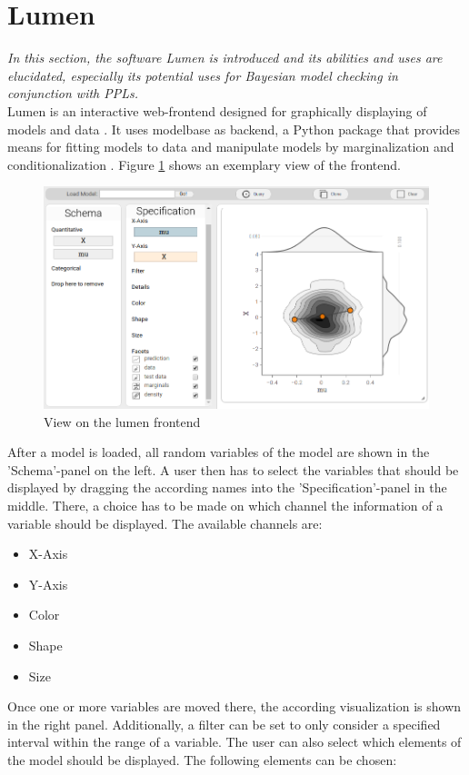 \documentclass{article}
\begin{document}
\section{Lumen}
\label{sec:Lumen}
\textit{In this section, the software Lumen is introduced and its abilities and uses are elucidated, especially its potential uses for Bayesian model checking in conjunction with PPLs.}
\\ 
Lumen is an interactive web-frontend designed for graphically displaying of models and data \cite{Lucas2016a}. It uses modelbase as backend, a Python package that provides means for fitting models to data and manipulate models by marginalization and conditionalization \cite{Lucas2016b}. Figure \ref{fig:lumen_screenshot} shows an exemplary view of the frontend.
\begin{figure}
	\includegraphics[width=\textwidth]{images/lumen_screenshot.png}
	\caption{View on the lumen frontend}
	\label{fig:lumen_screenshot}
\end{figure}
After a model is loaded, all random variables of the model are shown in the 'Schema'-panel on the left. A user then has to select the variables that should be displayed by dragging the according names into the 'Specification'-panel in the middle. There, a choice has to be made on which channel the information of a variable should be displayed. The available channels are:
\begin{itemize}
	\item X-Axis
	\item Y-Axis
	\item Color
	\item Shape
	\item Size
\end{itemize}
Once one or more variables are moved there, the according visualization is shown in the right panel. Additionally, a filter can be set to only consider a specified interval within the range of a variable. The user can also select which elements of the model should be displayed. The following elements can be chosen:
\end{document}
